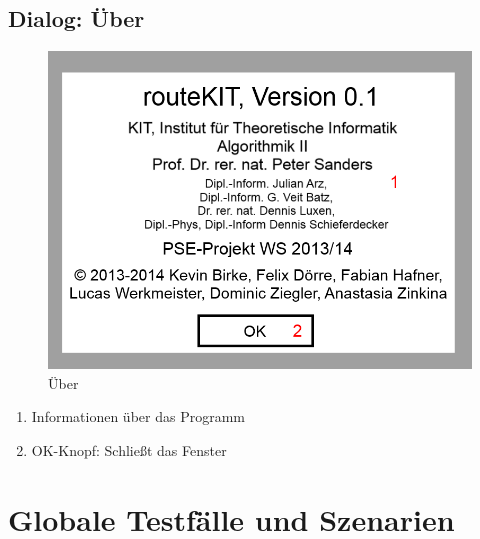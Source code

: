 \documentclass[a4paper, 11pt]{article}
\begin{document}
\subsection{Dialog: Über}
\begin{figure}[H]
\centering
\includegraphics[width=0.7\linewidth]{mockup_screenshot_about}
\caption{Über}
\label{fig:mockupabout}
\end{figure}
\begin{enumerate}
\item Informationen über das Programm
\item OK-Knopf: Schließt das Fenster
\end{enumerate}

\section{Globale Testfälle und Szenarien}
\end{document}
